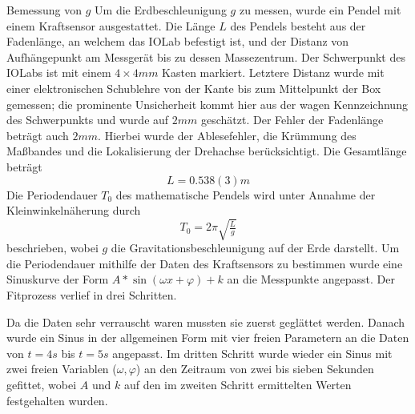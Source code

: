 \documentclass{alex_gp}
\begin{document}
\begin{mybox}{Bemessung von \( g \)}
	Um die Erdbeschleunigung \( g \) zu messen, wurde ein Pendel mit einem Kraftsensor ausgestattet. Die Länge \( L \) des Pendels besteht aus der Fadenlänge, an welchem das IOLab befestigt ist, und der Distanz von Aufhängepunkt am Messgerät bis zu dessen Massezentrum. Der Schwerpunkt des IOLabs ist mit einem \( 4\times 4 \unit{mm} \) Kasten markiert. Letztere Distanz wurde mit einer elektronischen Schublehre von der Kante bis zum Mittelpunkt der Box gemessen; die prominente Unsicherheit kommt hier aus der wagen Kennzeichnung des Schwerpunkts und wurde auf \( 2 \unit{mm} \) geschätzt. Der Fehler der Fadenlänge beträgt auch \( 2 \unit{mm} \). Hierbei wurde der Ablesefehler, die Krümmung des Maßbandes und die Lokalisierung der Drehachse berücksichtigt. Die Gesamtlänge beträgt 
	\begin{equation}
		L = 0.538(3) \unit{m}
	\end{equation}
	Die Periodendauer \( T_0 \) des mathematische Pendels wird unter Annahme der Kleinwinkelnäherung durch 
	\begin{equation}\label{eqn:T0}
		T_0 = 2\pi\sqrt{\tfrac{L}{g}}
	\end{equation}
	beschrieben, wobei \( g \) die Gravitationsbeschleunigung auf der Erde darstellt. Um die Periodendauer mithilfe der Daten des Kraftsensors zu bestimmen wurde eine Sinuskurve der Form \( A * \sin(\omega x + \varphi) + k \) an die Messpunkte angepasst. Der Fitprozess verlief in drei Schritten.\par 
	
	Da die Daten sehr verrauscht waren mussten sie zuerst geglättet werden. Danach wurde ein Sinus in der allgemeinen Form mit vier freien Parametern an die Daten von \( t = 4 \unit{s} \) bis \( t = 5 \unit{s} \) angepasst. Im dritten Schritt wurde wieder ein Sinus mit zwei freien Variablen (\( \omega, \varphi \)) an den Zeitraum von zwei bis sieben Sekunden gefittet, wobei \( A \) und \( k \) auf den im zweiten Schritt ermittelten Werten festgehalten wurden. \par 
	

\end{mybox}
\end{document}
